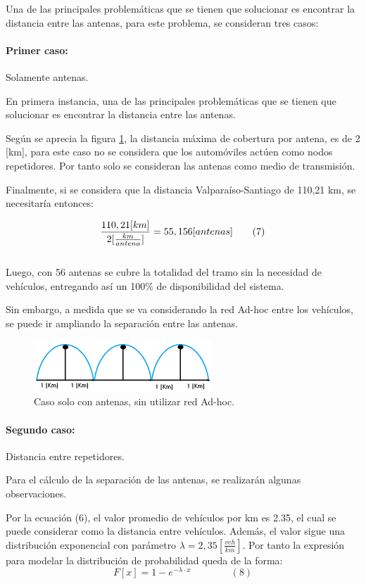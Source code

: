 \documentclass[12pt]{article}
\begin{document}
Una de las principales problemáticas que se tienen que solucionar es encontrar la distancia entre las antenas,
para este problema, se consideran tres casos:
\paragraph{Primer caso:} Solamente antenas.

En primera instancia, una de las principales problemáticas que se tienen que solucionar es encontrar la 
distancia entre las antenas. 

Según se aprecia la figura \ref{fig:s-adhoc}, la distancia máxima de cobertura por antena, es de 2 [km], 
para este caso no se considera que los automóviles actúen como nodos repetidores. Por tanto solo se 
consideran las antenas como medio de transmisión.

Finalmente, si se considera que la distancia Valparaíso-Santiago de 110,21 km, se necesitaría entonces:

\large $$ \frac{110,21 [km]}{2 [\frac{km}{antena}]}= 55,156 [antenas] \qquad \tiny(7)$$ \normalsize \\

Luego, con 56 antenas se cubre la totalidad del tramo sin la necesidad de vehículos, entregando así un 
100\% de disponibilidad del sistema.

Sin embargo, a medida que se va considerando la red Ad-hoc entre los vehículos, se puede ir  ampliando 
la separación entre las antenas.  

\begin{figure}[H]
  \centering
      \includegraphics[width=0.6\textwidth]{s-adhoc}
	    \caption{Caso solo con antenas, sin utilizar red Ad-hoc.}
	\label{fig:s-adhoc}
\end{figure}
\paragraph{Segundo caso:} Distancia entre repetidores.

Para el cálculo de la separación de las antenas, se realizarán algunas observaciones.

Por la ecuación (6), el valor promedio de vehículos por km es 2.35, el cual se puede considerar como 
la distancia entre vehículos. Además, el valor sigue una distribución exponencial con parámetro 
$\lambda=2,35 [\frac{veh}{km}]$. Por tanto la expresión para modelar la distribución de probabilidad queda 
de la forma:
$$ F[x]= 1-e^{-\lambda \cdot x} \qquad \qquad  (8)$$
\end{document}
